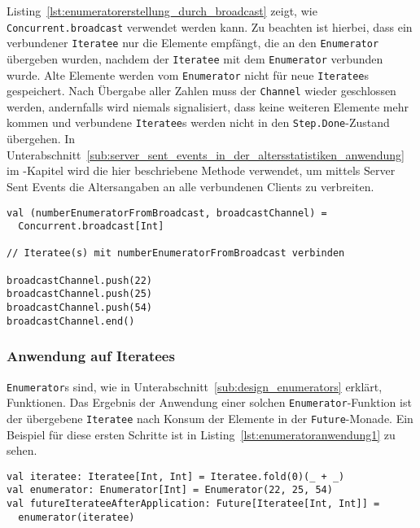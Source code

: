 Listing~\ref{lst:enumeratorerstellung_durch_broadcast} zeigt, wie \lstinline|Concurrent.broadcast| verwendet werden kann.
Zu beachten ist hierbei, dass ein verbundener \lstinline|Iteratee| nur die Elemente empfängt, die an den \lstinline|Enumerator| übergeben wurden, nachdem der \lstinline|Iteratee| mit dem \lstinline|Enumerator| verbunden wurde.
Alte Elemente werden vom \lstinline|Enumerator| nicht für neue \lstinline|Iteratee|s gespeichert.
Nach Übergabe aller Zahlen muss der \lstinline|Channel| wieder geschlossen werden, andernfalls wird niemals signalisiert, dass keine weiteren Elemente mehr kommen und verbundene \lstinline|Iteratee|s werden nicht in den \lstinline|Step.Done|-Zustand übergehen.
In Unterabschnitt~\ref{sub:server_sent_events_in_der_altersstatistiken_anwendung} im -Kapitel wird die hier beschriebene Methode verwendet, um mittels Server Sent Events die Altersangaben an alle verbundenen Clients zu verbreiten.

\begin{lstlisting}[caption=Erstellung eines Enumerators durch die broadcast-Konstruktormethode, label=lst:enumeratorerstellung_durch_broadcast]
val (numberEnumeratorFromBroadcast, broadcastChannel) =
  Concurrent.broadcast[Int]

// Iteratee(s) mit numberEnumeratorFromBroadcast verbinden

broadcastChannel.push(22)
broadcastChannel.push(25)
broadcastChannel.push(54)
broadcastChannel.end()
\end{lstlisting}



\subsubsection{Anwendung auf Iteratees} %
\label{ssub:anwendung_auf_iteratees}

\lstinline|Enumerator|s sind, wie in Unterabschnitt~\ref{sub:design_enumerators} erklärt, Funktionen.
Das Ergebnis der Anwendung einer solchen \lstinline|Enumerator|-Funktion ist der übergebene \lstinline|Iteratee| nach Konsum der Elemente in der \lstinline|Future|-Monade.
Ein Beispiel für diese ersten Schritte ist in Listing~\ref{lst:enumeratoranwendung1} zu sehen.

\begin{lstlisting}[caption=Anwendung eines Enumerators auf einen Iteratee, label=lst:enumeratoranwendung1]
val iteratee: Iteratee[Int, Int] = Iteratee.fold(0)(_ + _)
val enumerator: Enumerator[Int] = Enumerator(22, 25, 54)
val futureIterateeAfterApplication: Future[Iteratee[Int, Int]] =
  enumerator(iteratee)
\end{lstlisting}


